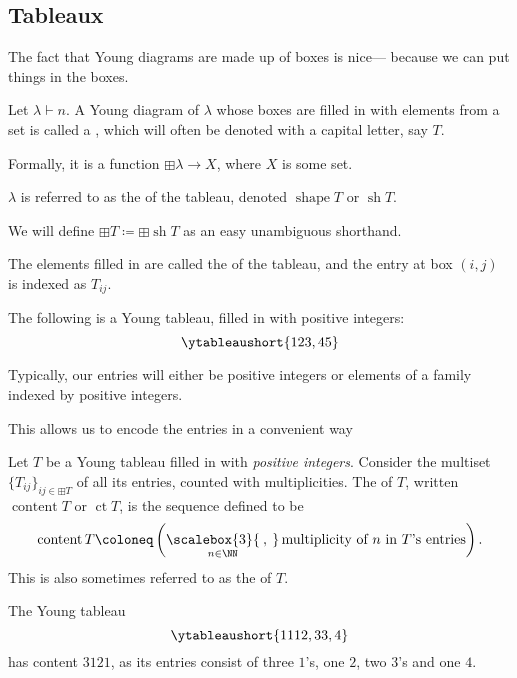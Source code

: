 \documentclass{article}
\newcommand{\bigcomma}{\ensuremath{\mathop{\scalebox{3}{\:,\:}}\limits}}
\DeclareMathOperator{\shape}{shape}
\DeclareMathOperator{\sh}{sh}
\DeclareMathOperator{\content}{content}
\DeclareMathOperator{\ct}{ct}
\begin{document}
\subsection{Tableaux}

The fact that Young diagrams are made up of boxes is nice--- because we can put things in the boxes. 

\begin{definition}
    Let $\lambda \vdash n$. A Young diagram of $\lambda$ whose boxes are filled in with elements from a set is called a , which will often be denoted with a capital letter, say $T$. 

    Formally, it is a function $\boxplus \lambda \to X$, where $X$ is some set.

    $\lambda$ is referred to as the  of the tableau, denoted $\shape T$ or $\sh T$.

    We will define $\boxplus T \coloneq \boxplus \sh T$ as an easy unambiguous shorthand.

    The elements filled in are called the  of the tableau, and the entry at box $(i,j)$ is indexed as $T_{ij}$.
\end{definition}

\begin{example}
    The following is a Young tableau, filled in with positive integers:
    \[
        \ytableaushort{123,45}
    \]
\end{example}

Typically, our entries will either be positive integers or elements of a family indexed by positive integers.

This allows us to encode the entries in a convenient way

\begin{definition}
    Let $T$ be a Young tableau filled in with \textit{positive integers}.
    Consider the multiset $\{T_{ij}\}_{ij \in \boxplus T}$ of all its entries, counted with multiplicities.
    The  of $T$, written $\content T$ or $\ct T$, is the sequence defined to be
    \[
        \content T
        \coloneq
        \left(
            \bigcomma_{n \in \NN}
            \text{multiplicity of }n\text{ in }T\text{'s entries}
        \right).
    \]
    This is also sometimes referred to as the  of $T$.
\end{definition}

\begin{example}
    The Young tableau
    \[
        \ytableaushort{1112,33,4}
    \]
    has content $3121$, as its entries consist of three $1$'s, one $2$, two $3$'s and one $4$.
\end{example}
\end{document}
